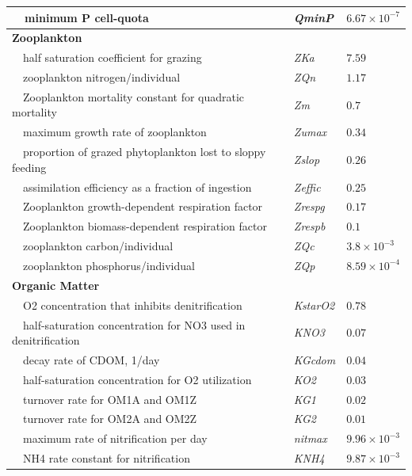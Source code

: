 \documentclass[letterpaper,12pt,oneside]{article}\usepackage[]{graphicx}\usepackage[]{color}
\begin{document}
\begin{table}[!tbp]
{\begin{center}
\begin{tabular}{lll}
~~minimum P cell-quota&\textit{QminP}&$6.67\times 10^{-7}$\tabularnewline
\hline
{\bfseries Zooplankton}&&\tabularnewline
~~half saturation coefficient for grazing&\textit{ZKa}&$7.59$\tabularnewline
~~zooplankton nitrogen/individual&\textit{ZQn}&$1.17$\tabularnewline
~~Zooplankton mortality constant for quadratic mortality&\textit{Zm}&$0.7$\tabularnewline
~~maximum growth rate of zooplankton&\textit{Zumax}&$0.34$\tabularnewline
~~proportion of grazed phytoplankton lost to sloppy feeding&\textit{Zslop}&$0.26$\tabularnewline
~~assimilation efficiency as a fraction of ingestion&\textit{Zeffic}&$0.25$\tabularnewline
~~Zooplankton growth-dependent respiration factor&\textit{Zrespg}&$0.17$\tabularnewline
~~Zooplankton biomass-dependent respiration factor&\textit{Zrespb}&$0.1$\tabularnewline
~~zooplankton carbon/individual&\textit{ZQc}&$3.8\times 10^{-3}$\tabularnewline
~~zooplankton phosphorus/individual&\textit{ZQp}&$8.59\times 10^{-4}$\tabularnewline
\hline
{\bfseries Organic Matter}&&\tabularnewline
~~O2 concentration that inhibits denitrification&\textit{KstarO2}&$0.78$\tabularnewline
~~half-saturation concentration for NO3 used in denitrification&\textit{KNO3}&$0.07$\tabularnewline
~~decay rate of CDOM, 1/day&\textit{KGcdom}&$0.04$\tabularnewline
~~half-saturation concentration for O2 utilization&\textit{KO2}&$0.03$\tabularnewline
~~turnover rate for OM1A and OM1Z&\textit{KG1}&$0.02$\tabularnewline
~~turnover rate for OM2A and OM2Z&\textit{KG2}&$0.01$\tabularnewline
~~maximum rate of nitrification per day&\textit{nitmax}&$9.96\times 10^{-3}$\tabularnewline
~~NH4 rate constant for nitrification&\textit{KNH4}&$9.87\times 10^{-3}$\tabularnewline
\hline
\end{tabular}\end{center}}

\end{table}
\end{document}
